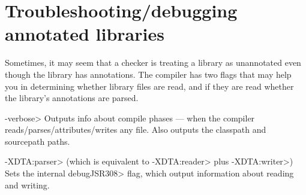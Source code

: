 \section{Troubleshooting/debugging annotated libraries\label{libraries-troubleshooting}}

Sometimes, it may seem that a checker is treating a library as unannotated
even though the library has annotations.  The compiler has two flags that
may help you in determining whether library files are read, and if they are
read whether the library's annotations are parsed.

\begin{description}
\item \<-verbose>
  Outputs info about compile phases --- when the compiler
  reads/parses/attributes/writes any file.  Also outputs the classpath and
  sourcepath paths.
\item \<-XDTA:parser> (which is equivalent to \<-XDTA:reader> plus \<-XDTA:writer>)
  Sets the internal \<debugJSR308> flag, which output information about
  reading and writing.
\end{description}


